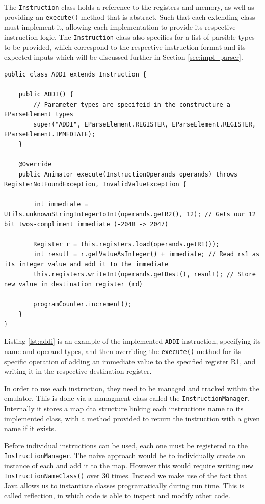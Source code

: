 The \texttt{Instruction} class holds a reference to the registers and memory, as well as providing an \texttt{execute()} method that is abstract. Such that each extending class must implement it, allowing each implementation to provide its respective instruction logic. The \texttt{Instruction} class also specifies for a list of parsible types to be provided, which correspond to the respective instruction format and its expected inputs which will be discussed further in Section \ref{sec:impl_parser}.

\begin{lstlisting}[caption=Implemented ADDI Insstruction, label=lst:addi]
public class ADDI extends Instruction {

    public ADDI() {
        // Parameter types are specifeid in the constructure a EParseElement types
        super("ADDI", EParseElement.REGISTER, EParseElement.REGISTER, EParseElement.IMMEDIATE);
    }

    @Override
    public Animator execute(InstructionOperands operands) throws RegisterNotFoundException, InvalidValueException {

        int immediate = Utils.unknownStringIntegerToInt(operands.getR2(), 12); // Gets our 12 bit twos-compliment immediate (-2048 -> 2047)

        Register r = this.registers.load(operands.getR1());
        int result = r.getValueAsInteger() + immediate; // Read rs1 as its integer value and add it to the immediate
        this.registers.writeInt(operands.getDest(), result); // Store new value in destination register (rd)
        
        programCounter.increment();
    }
}
\end{lstlisting}

Listing \ref{lst:addi} is an example of the implemented \texttt{ADDI} instruction, specifying its name and operand types, and then overriding the \verb|execute()| method for its specific operation of adding an immediate value to the specified register R1, and writing it in the respective destination register.

In order to use each instruction, they need to be managed and tracked within the emulator. This is done via a managment class called the \texttt{InstructionManager}. Internally it stores a map dta structure linking each instructions name to its implemented class, with a method provided to return the instruction with a given name if it exists.

Before individual instructions can be used, each one must be registered to the \texttt{InstructionManager}. The naive approach would be to individually create an instance of each and add it to the map. However this would require writing \verb|new InstructionNameClass()| over 30 times. Instead we make use of the fact that Java allows us to instantiate classes programatically during run time. This is called reflection, in which code is able to inspect and modify other code.

